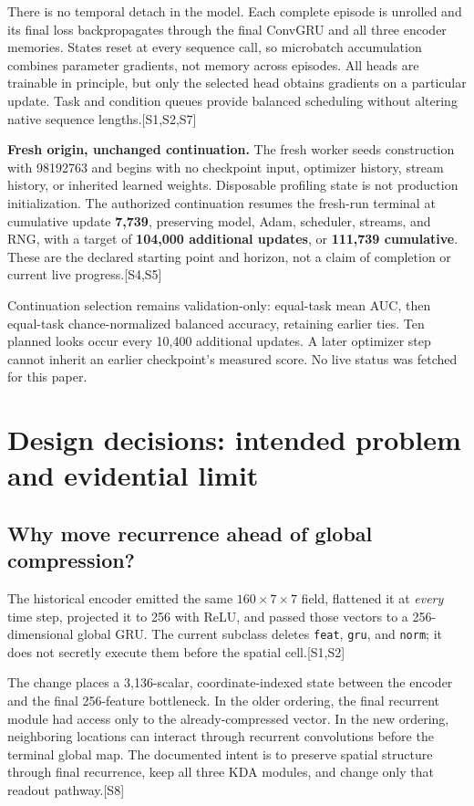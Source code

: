 \documentclass[10pt,letterpaper]{article}
\newcommand{\src}[1]{\textcolor{accent}{\textsf{[#1]}}}
\newcommand{\psection}[1]{\clearpage\section{#1}}
\begin{document}
There is no temporal detach in the model. Each complete episode is unrolled and its final loss backpropagates through the final ConvGRU and all three encoder memories. States reset at every sequence call, so microbatch accumulation combines parameter gradients, not memory across episodes. All heads are trainable in principle, but only the selected head obtains gradients on a particular update. Task and condition queues provide balanced scheduling without altering native sequence lengths.\src{S1,S2,S7}

\textbf{Fresh origin, unchanged continuation.} The fresh worker seeds construction with 98192763 and begins with no checkpoint input, optimizer history, stream history, or inherited learned weights. Disposable profiling state is not production initialization. The authorized continuation resumes the fresh-run terminal at cumulative update \textbf{7,739}, preserving model, Adam, scheduler, streams, and RNG, with a target of \textbf{104,000 additional updates}, or \textbf{111,739 cumulative}. These are the declared starting point and horizon, not a claim of completion or current live progress.\src{S4,S5}

Continuation selection remains validation-only: equal-task mean AUC, then equal-task chance-normalized balanced accuracy, retaining earlier ties. Ten planned looks occur every 10,400 additional updates. A later optimizer step cannot inherit an earlier checkpoint's measured score. No live status was fetched for this paper.

\psection{Design decisions: intended problem and evidential limit}
\subsection{Why move recurrence ahead of global compression?}
The historical encoder emitted the same $160\times7\times7$ field, flattened it at \emph{every} time step, projected it to 256 with ReLU, and passed those vectors to a 256-dimensional global GRU. The current subclass deletes \texttt{feat}, \texttt{gru}, and \texttt{norm}; it does not secretly execute them before the spatial cell.\src{S1,S2}

The change places a 3,136-scalar, coordinate-indexed state between the encoder and the final 256-feature bottleneck. In the older ordering, the final recurrent module had access only to the already-compressed vector. In the new ordering, neighboring locations can interact through recurrent convolutions before the terminal global map. The documented intent is to preserve spatial structure through final recurrence, keep all three KDA modules, and change only that readout pathway.\src{S8}
\end{document}

